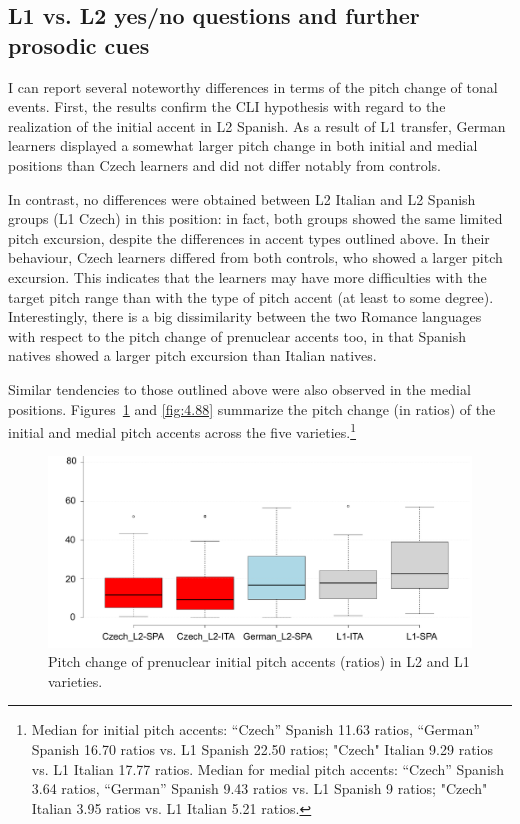 \subsection{L1 vs. L2 yes/no questions and further prosodic cues}\label{sec:4.3.4}

I can report several noteworthy differences in terms of the pitch change of tonal events. First, the results confirm the CLI hypothesis with regard to the realization of the initial accent in L2 Spanish. As a result of L1 transfer, German learners displayed a somewhat larger pitch change in both initial and medial positions than Czech learners and did not differ notably from controls.


In contrast, no differences were obtained between L2 Italian and L2 Spanish groups (L1 Czech) in this position: in fact, both groups showed the same limited pitch excursion, despite the differences in accent types outlined above. In their behaviour, Czech learners differed from both controls, who showed a larger pitch excursion. This indicates that the learners may have more difficulties with the target pitch range than with the type of pitch accent (at least to some degree). Interestingly, there is a big dissimilarity between the two Romance languages with respect to the pitch change of prenuclear accents too, in that Spanish natives showed a larger pitch excursion than Italian natives.



Similar tendencies to those outlined above were also observed in the medial positions. Figures~\ref{fig:4.87} and \ref{fig:4.88} summarize the pitch change (in ratios) of the initial and medial pitch accents across the five varieties.\footnote{Median for initial pitch accents: “Czech” Spanish 11.63 ratios, “German” Spanish 16.70 ratios vs. L1 Spanish 22.50 ratios; "Czech" Italian 9.29 ratios vs. L1 Italian 17.77 ratios. Median for medial pitch accents: “Czech” Spanish 3.64 ratios, “German” Spanish 9.43 ratios vs. L1 Spanish 9 ratios; "Czech" Italian 3.95 ratios vs. L1 Italian 5.21 ratios.}


\begin{figure}[p]
\includegraphics[width=\textwidth]{figures/Figure_87.pdf}
\caption{Pitch change of prenuclear initial pitch accents (ratios) in L2 and L1 varieties.}
\label{fig:4.87}
\end{figure}

